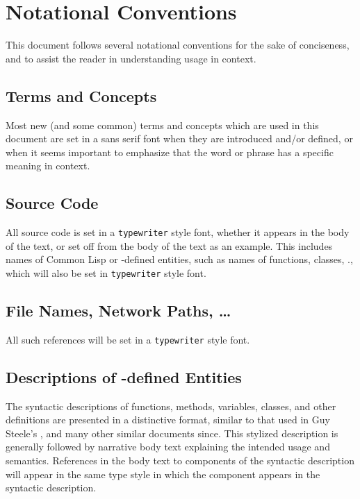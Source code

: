\section {Notational Conventions}

This document follows several notational conventions for the sake of
conciseness, and to assist the reader in understanding usage in context.

\subsection {Terms and Concepts}

Most new (and some common) terms and concepts which are used in this document
are set in a {\sf sans serif} font when they are introduced and/or defined, or when
it seems important to emphasize that the word or phrase has a specific meaning
in context.

\subsection {Source Code}

All source code is set in a {\tt typewriter} style font, whether it
appears in the body of the text, or set off from the body of the text as
an example.  This includes names of Common Lisp or \geco-defined
entities, such as names of functions, classes, \etc., which will also be
set in {\tt typewriter} style font.

\subsection {File Names, Network Paths, \ldots}

All such references will be set in a {\tt typewriter} style font.

\subsection {Descriptions of \Geco-defined Entities}

The syntactic descriptions of functions, methods, variables, classes, and other
definitions are presented in a distinctive format, similar to that used in Guy
Steele's  \cite{cl:steele2}, and many other
similar documents since. This stylized description is generally followed by
narrative body text explaining the intended usage and semantics. References in
the body text to components of the syntactic description will appear in the same
type style in which the component appears in the syntactic description.


